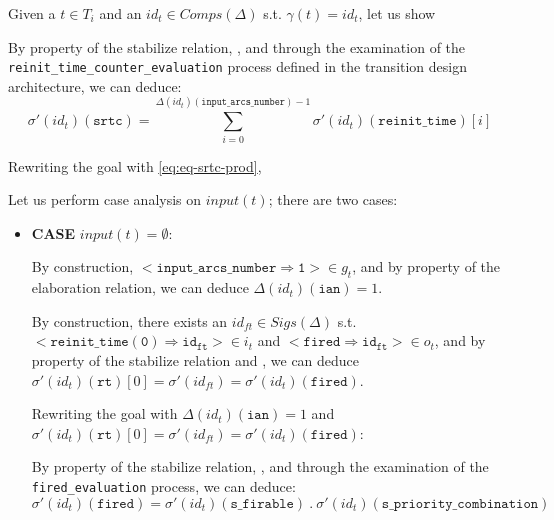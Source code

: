 \documentclass[dvipsnames,12pt]{article}
\begin{document}
\begin{niproof}
  Given a $t\in{}T_i$ and an $id_t\in{}Comps(\Delta)$
  s.t. $\gamma(t)=id_t$, let us show\\

  \exT

  By property of the \hvhdl{} stabilize relation, \InCsCompT, and
  through the examination of the
  \texttt{reinit_time_counter_evaluation} process defined in the
  transition design architecture, we can deduce:
  \begin{equation}
    \sigma'(id_t)(\texttt{srtc})=\sum\limits_{i=0}^{\Delta(id_t)(\texttt{input\_arcs\_number})-1}\sigma'(id_t)(\texttt{reinit\_time})[i]\label{eq:eq-srtc-prod}
  \end{equation}

  Rewriting the goal with \eqref{eq:eq-srtc-prod},
  
  Let us perform case analysis on $input(t)$; there are two cases:

  \begin{itemize}
  \item \textbf{CASE} $input(t)=\emptyset$:

    By construction,
    ${<}\mathtt{input\_arcs\_number\Rightarrow{}1}{>}\in{}g_t$, and
    by property of the elaboration relation, we can deduce
    $\Delta(id_t)(\texttt{ian})=1$.

    By construction, there exists an $id_{ft}\in{}Sigs(\Delta)$ s.t.
    ${<}\mathtt{reinit\_time(0)\Rightarrow{}id_{ft}}{>}\in{}i_t$ and
    ${<}\mathtt{fired\Rightarrow{}id_{ft}}{>}\in{}o_t$, and by
    property of the stabilize relation and \InCsCompT, we can deduce
    $\sigma'(id_t)(\texttt{rt})[0]=\sigma'(id_{ft})=\sigma'(id_t)(\texttt{fired})$.

    Rewriting the goal with $\Delta(id_t)(\texttt{ian})=1$ and
    $\sigma'(id_t)(\texttt{rt})[0]=\sigma'(id_{ft})=\sigma'(id_t)(\texttt{fired})$:
    
    By property of the stabilize relation, \InCsCompT{}, and through
    the examination of the \texttt{fired_evaluation} process, we can deduce:
    \begin{equation}
      \sigma'(id_t)(\texttt{fired})=\sigma'(id_t)(\texttt{s\_firable})~.~\sigma'(id_t)(\texttt{s\_priority\_combination})\label{eq:fired-at-re}
    \end{equation}


\end{itemize}
\end{niproof}
\end{document}
